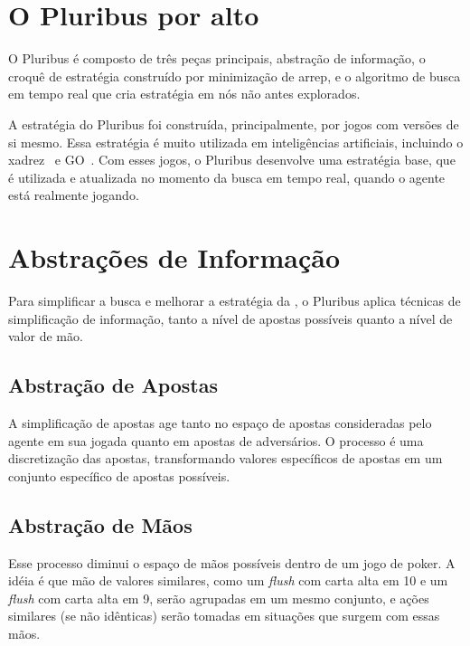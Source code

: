 \documentclass[twocolumn]{article}
\theoremstyle{mytheoremstyle}
\theoremstyle{mytheoremstyle}
\theoremstyle{myproblemstyle}
\begin{document}

    \section{O Pluribus por alto} %
    \label{sec:O Pluribus por alto}
        O Pluribus é composto de três peças principais, abstração de informação, o croquê de estratégia construído por minimização de \gls{arrep},
        e o algoritmo de busca em tempo real que cria estratégia em nós não antes explorados.

        A estratégia do Pluribus foi construída, principalmente, por jogos com versões de si mesmo. Essa estratégia é muito utilizada em inteligências
        artificiais, incluindo o xadrez~\cite{DBLP:journals/corr/abs-1712-01815} e GO~\cite{Silver2016}. Com esses jogos, o Pluribus desenvolve uma estratégia
        base, que é utilizada e atualizada no momento da busca em tempo real, quando o agente está realmente jogando.

    \section{Abstrações de Informação } %
    \label{sec:Simplificação de Informação }
        Para simplificar a busca e melhorar a estratégia da , o Pluribus aplica técnicas de simplificação de informação, tanto a nível de apostas
        possíveis quanto a nível de valor de mão.

        \subsection{Abstração de Apostas} %
        \label{sub:Simplificação de Apostas}

            A simplificação de apostas age tanto no espaço de apostas consideradas pelo agente em sua jogada quanto em apostas de adversários. O processo
            é uma discretização das apostas, transformando valores específicos de apostas em um conjunto específico de apostas possíveis.


        \subsection{Abstração de Mãos} %
        \label{sub:Simplificação de Mãos}
            Esse processo diminui o espaço de mãos possíveis dentro de um jogo de poker. A idéia é que mão de valores similares, como um \emph{flush}
            com carta alta em 10 e um \emph{\gls{flush}} com carta alta em 9, serão agrupadas em um mesmo conjunto, e ações similares (se não idênticas) serão
            tomadas em situações que surgem com essas mãos.
\end{document}

